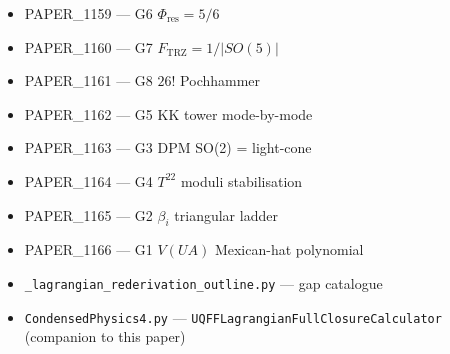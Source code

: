 \documentclass[
]{article}
\providecommand{\tightlist}{%
  \setlength{\itemsep}{0pt}\setlength{\parskip}{0pt}}
\begin{document}
\begin{itemize}
\tightlist
\item
  PAPER\_1159 --- G6 \(\Phi_{\mathrm{res}} = 5/6\)
\item
  PAPER\_1160 --- G7 \(F_{\mathrm{TRZ}} = 1/|SO(5)|\)
\item
  PAPER\_1161 --- G8 \(26!\) Pochhammer
\item
  PAPER\_1162 --- G5 KK tower mode-by-mode
\item
  PAPER\_1163 --- G3 DPM SO(2) = light-cone
\item
  PAPER\_1164 --- G4 \(T^{22}\) moduli stabilisation
\item
  PAPER\_1165 --- G2 \(\beta_i\) triangular ladder
\item
  PAPER\_1166 --- G1 \(V(UA)\) Mexican-hat polynomial
\item
  \texttt{\_lagrangian\_rederivation\_outline.py} --- gap catalogue
\item
  \texttt{CondensedPhysics4.py} ---
  \texttt{UQFFLagrangianFullClosureCalculator} (companion to this paper)
\end{itemize}
\end{document}

